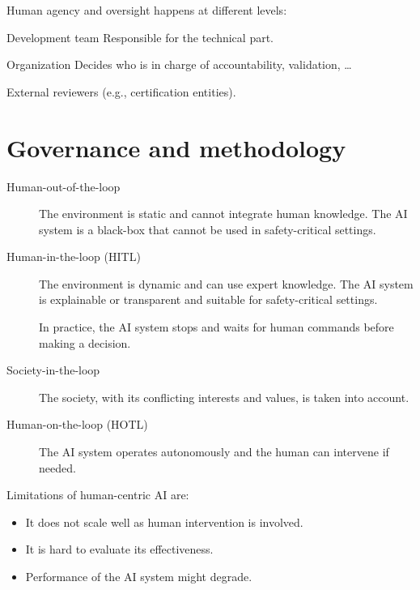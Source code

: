 \begin{remark}
    Human agency and oversight happens at different levels:
    \begin{descriptionlist}
        \item[Development team] Responsible for the technical part.
        \item[Organization] Decides who is in charge of accountability, validation, \dots
        \item[External reviewers] (e.g., certification entities).
    \end{descriptionlist}
\end{remark}


\section{Governance and methodology}

\begin{description}
    \item[Human-out-of-the-loop] 
        The environment is static and cannot integrate human knowledge. The AI system is a black-box that cannot be used in safety-critical settings.

    \item[Human-in-the-loop (HITL)] 
        The environment is dynamic and can use expert knowledge. The AI system is explainable or transparent and suitable for safety-critical settings.

        In practice, the AI system stops and waits for human commands before making a decision.

    \item[Society-in-the-loop] 
        The society, with its conflicting interests and values, is taken into account.

    \item[Human-on-the-loop (HOTL)] 
        The AI system operates autonomously and the human can intervene if needed.
\end{description}

\begin{remark}
    Limitations of human-centric AI are:
    \begin{itemize}
        \item It does not scale well as human intervention is involved.
        \item It is hard to evaluate its effectiveness.
        \item Performance of the AI system might degrade.
    \end{itemize}
\end{remark}



